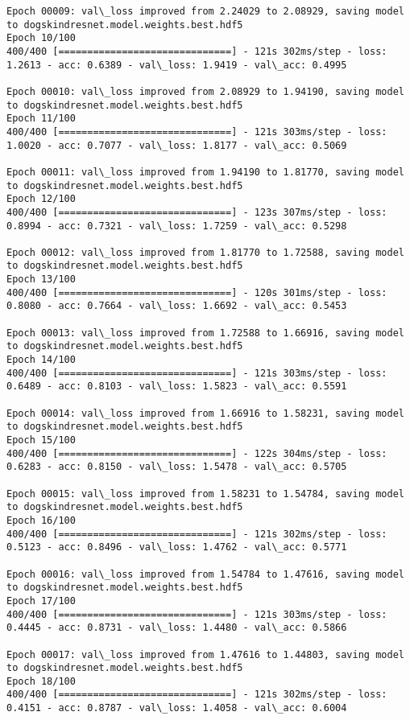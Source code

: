 \documentclass[11pt]{article}
\begin{document}
\begin{Verbatim}[commandchars=\\\{\}]
Epoch 00009: val\_loss improved from 2.24029 to 2.08929, saving model to dogskindresnet.model.weights.best.hdf5
Epoch 10/100
400/400 [==============================] - 121s 302ms/step - loss: 1.2613 - acc: 0.6389 - val\_loss: 1.9419 - val\_acc: 0.4995

Epoch 00010: val\_loss improved from 2.08929 to 1.94190, saving model to dogskindresnet.model.weights.best.hdf5
Epoch 11/100
400/400 [==============================] - 121s 303ms/step - loss: 1.0020 - acc: 0.7077 - val\_loss: 1.8177 - val\_acc: 0.5069

Epoch 00011: val\_loss improved from 1.94190 to 1.81770, saving model to dogskindresnet.model.weights.best.hdf5
Epoch 12/100
400/400 [==============================] - 123s 307ms/step - loss: 0.8994 - acc: 0.7321 - val\_loss: 1.7259 - val\_acc: 0.5298

Epoch 00012: val\_loss improved from 1.81770 to 1.72588, saving model to dogskindresnet.model.weights.best.hdf5
Epoch 13/100
400/400 [==============================] - 120s 301ms/step - loss: 0.8080 - acc: 0.7664 - val\_loss: 1.6692 - val\_acc: 0.5453

Epoch 00013: val\_loss improved from 1.72588 to 1.66916, saving model to dogskindresnet.model.weights.best.hdf5
Epoch 14/100
400/400 [==============================] - 121s 303ms/step - loss: 0.6489 - acc: 0.8103 - val\_loss: 1.5823 - val\_acc: 0.5591

Epoch 00014: val\_loss improved from 1.66916 to 1.58231, saving model to dogskindresnet.model.weights.best.hdf5
Epoch 15/100
400/400 [==============================] - 122s 304ms/step - loss: 0.6283 - acc: 0.8150 - val\_loss: 1.5478 - val\_acc: 0.5705

Epoch 00015: val\_loss improved from 1.58231 to 1.54784, saving model to dogskindresnet.model.weights.best.hdf5
Epoch 16/100
400/400 [==============================] - 121s 302ms/step - loss: 0.5123 - acc: 0.8496 - val\_loss: 1.4762 - val\_acc: 0.5771

Epoch 00016: val\_loss improved from 1.54784 to 1.47616, saving model to dogskindresnet.model.weights.best.hdf5
Epoch 17/100
400/400 [==============================] - 121s 303ms/step - loss: 0.4445 - acc: 0.8731 - val\_loss: 1.4480 - val\_acc: 0.5866

Epoch 00017: val\_loss improved from 1.47616 to 1.44803, saving model to dogskindresnet.model.weights.best.hdf5
Epoch 18/100
400/400 [==============================] - 121s 302ms/step - loss: 0.4151 - acc: 0.8787 - val\_loss: 1.4058 - val\_acc: 0.6004


\end{Verbatim}
\end{document}
